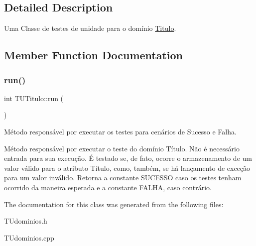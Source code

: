 \subsection{Detailed Description}
Uma Classe de testes de unidade para o domínio \hyperlink{classTitulo}{Titulo}. 

\subsection{Member Function Documentation}
\mbox{\label{classTUTitulo_a2bf05b935f07f368b03c694d1f8ce8c7}} 
\subsubsection{\texorpdfstring{run()}{run()}}
{\footnotesize\ttfamily int T\+U\+Titulo\+::run (\begin{DoxyParamCaption}{ }\end{DoxyParamCaption})}



Método responsável por executar os testes para cenários de Sucesso e Falha. 

Método responsável por executar o teste do domínio Título. Não é necessário entrada para sua execução. É testado se, de fato, ocorre o armazenamento de um valor válido para o atributo Título, como, também, se há lançamento de exceção para um valor inválido. Retorna a constante S\+U\+C\+E\+S\+SO caso os testes tenham ocorrido da maneira esperada e a constante F\+A\+L\+HA, caso contrário. 

The documentation for this class was generated from the following files\+:\begin{DoxyCompactItemize}
\item 
T\+Udominios.\+h\item 
T\+Udominios.\+cpp\end{DoxyCompactItemize}
